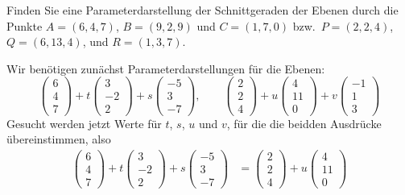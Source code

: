 Finden Sie eine Parameterdarstellung der Schnittgeraden der Ebenen
durch die Punkte $A=(6,4,7)$, $B=(9,2,9)$ und $C=(1,7,0)$ bzw.~$P=(2,2,4)$,
$Q=(6,13,4)$, und $R=(1,3,7)$.

\begin{loesung}
Wir benötigen zunächst Parameterdarstellungen für die Ebenen:
\[
\begin{pmatrix}6\\4\\7\end{pmatrix}
+t
\begin{pmatrix}3\\-2\\2\end{pmatrix}
+s
\begin{pmatrix}-5\\3\\-7\end{pmatrix}
,\qquad
\begin{pmatrix}2\\2\\4\end{pmatrix}
+u
\begin{pmatrix}4\\11\\0\end{pmatrix}
+v
\begin{pmatrix}-1\\1\\3\end{pmatrix}
\]
Gesucht werden jetzt Werte für $t$, $s$, $u$ und $v$, für die
die beidden Ausdrücke übereinstimmen, also
\begin{align*}
\begin{pmatrix}6\\4\\7\end{pmatrix}
+t
\begin{pmatrix}3\\-2\\2\end{pmatrix}
+s
\begin{pmatrix}-5\\3\\-7\end{pmatrix}
&=
\begin{pmatrix}2\\2\\4\end{pmatrix}
+u
\begin{pmatrix}4\\11\\0\end{pmatrix}

\end{align*}
\end{loesung}
